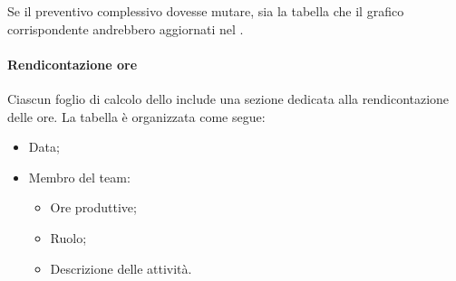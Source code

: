 \par Se il preventivo complessivo dovesse mutare, sia la tabella che il grafico corrispondente andrebbero aggiornati nel \PdP.

\paragraph*{Rendicontazione ore} Ciascun foglio di calcolo dello  include una sezione dedicata alla rendicontazione delle ore. La tabella è organizzata come segue:
\begin{itemize}
  \item Data;
  \item Membro del team:
  \begin{itemize}
    \item Ore produttive;
    \item Ruolo;
    \item Descrizione delle attività.
  \end{itemize}
\end{itemize}
